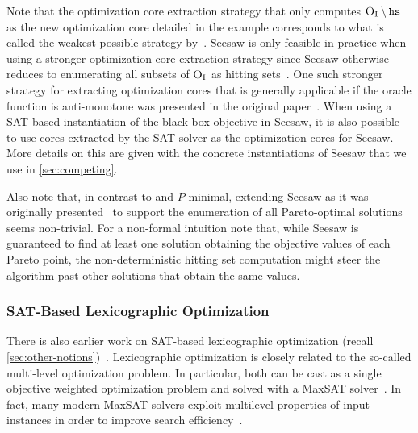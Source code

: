 Note that the optimization core extraction strategy that only computes $\textsc{O}_{\text{I}} \setminus \texttt{hs}$ as the new optimization core detailed in the example corresponds to what is called the weakest possible strategy by~\textcite{DBLP:conf/cp/JanotaMSM21}.
Seesaw is only feasible in practice when using a stronger optimization core extraction strategy since Seesaw otherwise reduces to enumerating all subsets of $\textsc{O}_{\text{I}}$ as hitting sets~\autocite{DBLP:conf/cp/JanotaMSM21}.
One such stronger strategy for extracting optimization cores that is generally applicable if the oracle function is anti-monotone was presented in the original paper~\autocite{DBLP:conf/cp/JanotaMSM21}.
When using a SAT-based instantiation of the black box objective in Seesaw, it is also possible to use cores extracted by the SAT solver as the optimization cores for Seesaw.
More details on this are given with the concrete instantiations of Seesaw that we use in \cref{sec:competing}.

Also note that, in contrast to \algname{} and $P$-minimal, extending Seesaw as it was originally presented~\autocite{DBLP:conf/cp/JanotaMSM21} to support the enumeration of all Pareto-optimal solutions seems non-trivial.
For a non-formal intuition note that, while Seesaw is guaranteed to find at least one solution obtaining the objective values of each Pareto point, the non-deterministic hitting set computation might steer the algorithm past other solutions that obtain the same values.

\subsubsection{SAT-Based Lexicographic Optimization\label{sec:lex-opt}}

There is also earlier work on SAT-based lexicographic optimization (recall \cref{sec:other-notions})~\autocites{DBLP:journals/ors/EhrgottG00,DBLP:conf/ijcai/ArgelichLS09,DBLP:journals/amai/Marques-SilvaAGL11}. 
Lexicographic optimization is closely related to the so-called multi-level optimization problem.
In particular, both can be cast as a single objective weighted optimization problem and solved with a MaxSAT solver~\autocites{DBLP:conf/ijcai/ArgelichLS09,DBLP:journals/amai/Marques-SilvaAGL11}.
In fact, many modern MaxSAT solvers exploit multilevel properties of input instances in order to improve search efficiency~\autocites{DBLP:conf/vmcai/PaxianRB21,DBLP:conf/cp/AnsoteguiBGL12}.

